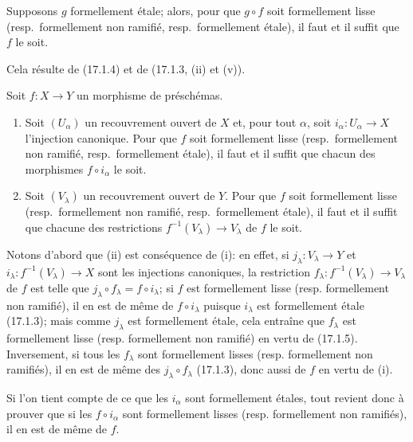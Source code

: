 \begin{corollary}[17.1.5]
\label{IV.17.1.5}
Supposons $g$ formellement étale; alors, pour que $g\circ f$ soit formellement lisse \textup{(resp.}\ formellement non ramifié, \textup{resp.}\ formellement étale\textup{)}, il faut et il suffit que $f$ le soit.
\end{corollary}

Cela résulte de (17.1.4) et de (17.1.3, (ii) et (v)).

\begin{proposition}[17.1.6]
\label{IV.17.1.6}
Soit $f:X\to Y$ un morphisme de préschémas.
\begin{enumerate}
  \item[\textup{(i)}] Soit $(U_\alpha)$ un recouvrement ouvert de $X$ et, pour tout $\alpha$, soit $i_\alpha:U_\alpha\to X$ l'injection canonique. Pour que $f$ soit formellement lisse \textup{(resp.}\ formellement non ramifié, \textup{resp.}\ formellement étale\textup{)}, il faut et il suffit que chacun des morphismes $f\circ i_\alpha$ le soit.
  \item[\textup{(ii)}] Soit $(V_\lambda)$ un recouvrement ouvert de $Y$. Pour que $f$ soit formellement lisse \textup{(resp.}\ formellement non ramifié, \textup{resp.}\ formellement étale\textup{)}, il faut et il suffit que chacune des restrictions $f^{-1}(V_\lambda)\to V_\lambda$ de $f$ le soit.
\end{enumerate}
\end{proposition}

Notons d'abord que (ii) est conséquence de (i): en effet, si $j_\lambda:V_\lambda\to Y$ et $i_\lambda:f^{-1}(V_\lambda)\to X$ sont les injections canoniques, la restriction $f_\lambda:f^{-1}(V_\lambda)\to V_\lambda$ de $f$ est telle que $j_\lambda\circ f_\lambda=f\circ i_\lambda$; si $f$ est formellement lisse (resp. formellement non ramifié), il en est de même de $f\circ i_\lambda$ puisque $i_\lambda$ est formellement étale (17.1.3); mais comme $j_\lambda$ est formellement étale, cela entraîne que $f_\lambda$ est formellement lisse (resp. formellement non ramifié) en vertu de (17.1.5). Inversement, si tous les $f_\lambda$ sont formellement lisses (resp. formellement non ramifiés), il en est de même des $j_\lambda\circ f_\lambda$ (17.1.3), donc aussi de $f$ en vertu de (i).

Si l'on tient compte de ce que les $i_\alpha$ sont formellement étales, tout revient donc à prouver que si les $f\circ i_\alpha$ sont formellement lisses (resp. formellement non ramifiés), il en est de même de $f$.

